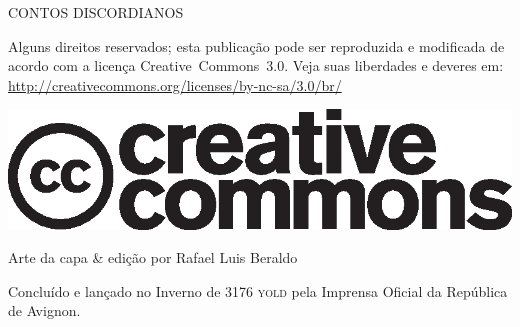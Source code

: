 \thispagestyle{empty}
\begin{center}
{\tiny
CONTOS DISCORDIANOS

\vspace{.5cm}

\begin{minipage}[h]{.5\textwidth}
Alguns direitos reservados; esta publicação pode ser reproduzida e modificada de acordo com a licença \foreignlanguage{english}{Creative~Commons~3.0}. Veja suas liberdades e deveres em: \url{http://creativecommons.org/licenses/by-nc-sa/3.0/br/}
	\begin{center}
	\includegraphics[scale=.2]{cc.eps}
	\end{center}
\end{minipage}

\vspace{.5cm}

\begin{minipage}[h]{.5\textwidth}
Arte da capa \& edição por Rafael Luis Beraldo
\end{minipage}

\vfill

\begin{minipage}[h]{.5\textwidth}
Concluído e lançado no Inverno de 3176 \textsc{yold} pela Imprensa Oficial da República de Avignon.
\end{minipage}
}
\end{center}

\newpage
